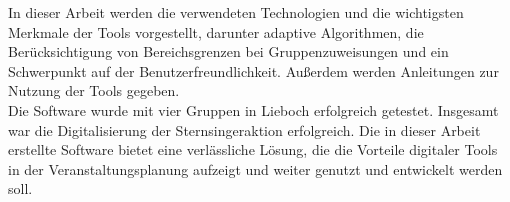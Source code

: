 \begin{spacing}{1.5}
In dieser Arbeit werden die verwendeten Technologien und die wichtigsten Merkmale der Tools vorgestellt, darunter adaptive Algorithmen, die Berücksichtigung von Bereichsgrenzen bei Gruppenzuweisungen und ein Schwerpunkt auf der Benutzerfreundlichkeit. Außerdem werden Anleitungen zur Nutzung der Tools gegeben.\\

Die Software wurde mit vier Gruppen in Lieboch erfolgreich getestet. Insgesamt war die Digitalisierung der Sternsingeraktion erfolgreich. Die in dieser Arbeit erstellte Software bietet eine verlässliche Lösung, die die Vorteile digitaler Tools in der Veranstaltungsplanung aufzeigt und weiter genutzt und entwickelt werden soll.\\

\end{spacing}
